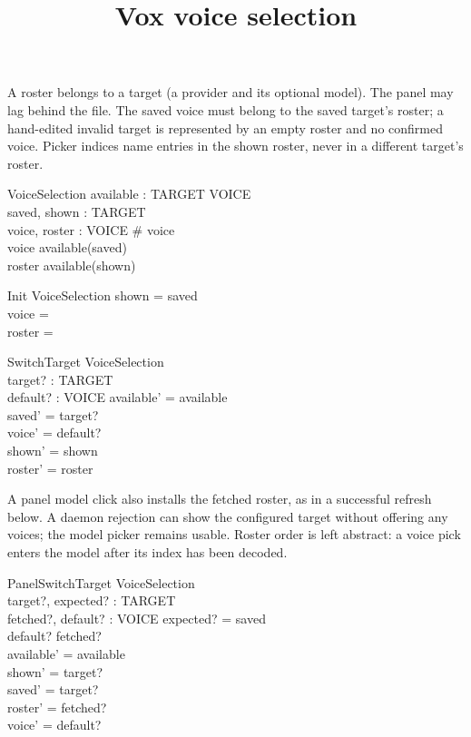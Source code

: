 \documentclass[a4paper,10pt,fleqn]{article}
\begin{document}
\title{Vox voice selection}
\maketitle

A roster belongs to a target (a provider and its optional model).
The panel may lag behind the file. The saved voice must belong to the
saved target's roster; a hand-edited invalid target is represented by
an empty roster and no confirmed voice. Picker indices name entries in
the shown roster, never in a different target's roster.

\begin{zed}
\end{zed}

\begin{schema}{VoiceSelection}
  available : TARGET \fun \power VOICE \\
  saved, shown : TARGET \\
  voice, roster : \power VOICE
\where
  \# voice  \\
  voice \subseteq available(saved) \\
  roster \subseteq available(shown)
\end{schema}

\begin{schema}{Init}
  VoiceSelection
\where
  shown = saved \\
  voice = \emptyset \\
  roster = \emptyset
\end{schema}

\begin{schema}{SwitchTarget}
  \Delta VoiceSelection \\
  target? : TARGET \\
  default? : \power VOICE
\where
  available' = available \\
  saved' = target? \\
  voice' = default? \\
  shown' = shown \\
  roster' = roster
\end{schema}

A panel model click also installs the fetched roster, as in a successful
refresh below. A daemon rejection can show the configured target without
offering any voices; the model picker remains usable. Roster order is left
abstract: a voice pick enters the model after its index has been decoded.

\begin{schema}{PanelSwitchTarget}
  \Delta VoiceSelection \\
  target?, expected? : TARGET \\
  fetched?, default? : \power VOICE
\where
  expected? = saved \\
  default? \subseteq fetched? \\
  available' = available \\
  shown' = target? \\
  saved' = target? \\
  roster' = fetched? \\
  voice' = default?
\end{schema}
\end{document}
